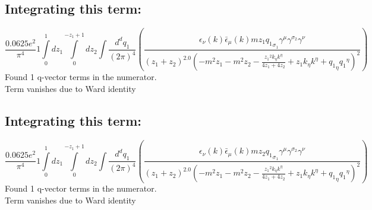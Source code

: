 \subsection*{Integrating this term:}
\begin{dmath}\frac{0.0625 e^{2}}{\pi^{4}}1\int\limits_{ 0 }^{ 1 } d{ z_{ 1 } }\int\limits_{ 0 }^{ - { z_{ 1 } } + 1 } d{ z_{ 2 } }\int\frac{d^d q_1 }{ (2\pi)^4 }\left(\frac{\epsilon_{ \nu }({ k }) \bar{\epsilon}_{ \mu }({ k }) m { z_{ 1 } } { { q_1 }_{ \sigma_1 } } { \gamma^{ \mu } } { \gamma^{ \sigma_2 } } { \gamma^{ \nu } }}{\left({ z_{ 1 } } + { z_{ 2 } }\right)^{2.0} \left(- m^{2} { z_{ 1 } } - m^{2} { z_{ 2 } } - \frac{{ z_{ 1 } }^{2} { { k }_{ \eta } } { { k }^{ \eta } }}{4 { z_{ 1 } } + 4 { z_{ 2 } }} + { z_{ 1 } } { { k }_{ \eta } } { { k }^{ \eta } } + { { q_1 }_{ \eta } } { { q_1 }^{ \eta } }\right)^{2}}\right)\end{dmath}
Found 1 q-vector terms in the numerator.\\
Term vanishes due to Ward identity\\
\subsection*{Integrating this term:}
\begin{dmath}\frac{0.0625 e^{2}}{\pi^{4}}1\int\limits_{ 0 }^{ 1 } d{ z_{ 1 } }\int\limits_{ 0 }^{ - { z_{ 1 } } + 1 } d{ z_{ 2 } }\int\frac{d^d q_1 }{ (2\pi)^4 }\left(\frac{\epsilon_{ \nu }({ k }) \bar{\epsilon}_{ \mu }({ k }) m { z_{ 2 } } { { q_1 }_{ \sigma_1 } } { \gamma^{ \mu } } { \gamma^{ \sigma_2 } } { \gamma^{ \nu } }}{\left({ z_{ 1 } } + { z_{ 2 } }\right)^{2.0} \left(- m^{2} { z_{ 1 } } - m^{2} { z_{ 2 } } - \frac{{ z_{ 1 } }^{2} { { k }_{ \eta } } { { k }^{ \eta } }}{4 { z_{ 1 } } + 4 { z_{ 2 } }} + { z_{ 1 } } { { k }_{ \eta } } { { k }^{ \eta } } + { { q_1 }_{ \eta } } { { q_1 }^{ \eta } }\right)^{2}}\right)\end{dmath}
Found 1 q-vector terms in the numerator.\\
Term vanishes due to Ward identity\\
